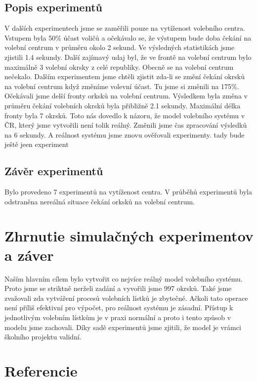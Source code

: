 \documentclass[12pt,a4paper,titlepage,final]{article}
\begin{document}
\subsection{Popis experimentů}
V dalších experimentech jsme se zaměřili pouze na vytíženost volebního centra. 
Vstupem byla 50\% účast voličů a očekávalo se, že výstupem bude doba čekání na volební centrum v průměru okolo 2 sekund. Ve výsledných statistikách jsme zjistili 1.4 sekundy. Další zajímavý udaj byl, že ve frontě na volební centrum bylo maximálně 3 volební okrsky z celé republiky. Obecně se na volební centrum nečekalo. \newline
Dalším experimentem jsme chtěli zjistit zda-li se změní čekání okrsků na volební centrum když změníme volevní účast. Tu jsme si změnili na 175\%. Očekávali jsme delší fronty orksků na volební centrum. Výsledkem byla změna v průměru čekání volebních okrsků byla přibližně 2.1 sekundy. Maximální délka fronty byla 7 okrsků. \newline
Toto nás dovedlo k názoru, že model volebního systému v ČR, který jsme vytvořili není tolik reálný. Změnili jsme čas zpracování výsledků na 6 sekundy. A reálnost systému jsme znovu ověřovali experimenty.
\newline
\newline
tady bude ještě jeen experiment
\newline
\newline
\subsection{Závěr experimentů}
Bylo provedeno 7 experimentů na vytíženost centra. V průběhů experimentů byla odstraněna nereálná situace čekání orksků na volební centrum.


\section{Zhrnutie simulačných experimentov a záver}
Naším hlavním cílem bylo vytvořit co nejvíce reálný model volebního systému. Proto jsme se striktně nerželi zadání a vyvořili jsme 997 okrsků. Také jsme zvažovali zda vytváření procesů volebních lístků je zbytečné. Ačkoli tato operace není příliš efektivní pro výpočet, pro reálnost systému je zásadní. Přístup k jednotlivým volebním lístkům je v praxi normální a proto i tento způsob v modelu jsme zachovali.\newline
Díky sadě experimentů jsme zjitili, že model je vrámci školního projektu validní.




\newpage

\section{Referencie}





\newpage
\end{document}
